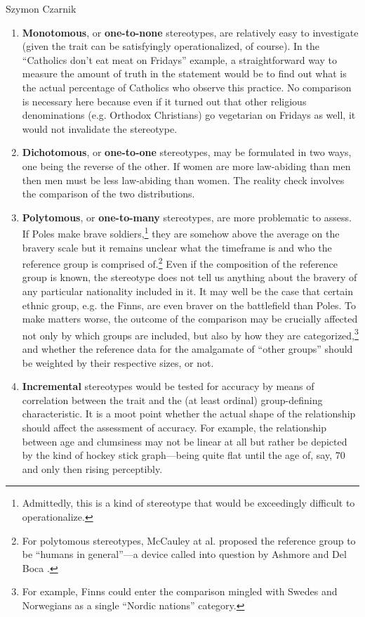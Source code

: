\begin{artengenv}{Szymon Czarnik}
\begin{enumerate}
\item \textbf{Monotomous}, or \textbf{one-to-none} stereotypes, are relatively easy to investigate (given the trait can be satisfyingly operationalized, of course). In the ``Catholics don't eat meat on Fridays'' example, a straightforward way to measure the amount of truth in the statement would be to find out what is the actual percentage of Catholics who observe this practice. No comparison is necessary here because even if it turned out that other religious denominations (e.g. Orthodox Christians) go vegetarian on Fridays as well, it would not invalidate the stereotype.
\item \textbf{Dichotomous}, or \textbf{one-to-one} stereotypes, may be formulated in two ways, one being the reverse of the other. If women are more law-abiding than men then men must be less law-abiding than women. The reality check involves the comparison of the two distributions.
\item \textbf{Polytomous}, or \textbf{one-to-many} stereotypes, are more problematic to assess. If Poles make brave soldiers,\footnote{Admittedly, this is a kind of stereotype that would be exceedingly difficult to operationalize.} they are somehow above the average on the bravery scale but it remains unclear what the timeframe is and who the reference group is comprised of.\footnote{For polytomous stereotypes, McCauley at al.
\parencite*[][]{mccauley_stereotyping_1980} %
 proposed the reference group to be ``humans in general''—a device called into question by Ashmore and Del Boca 
\parencite*[][]{hamilton_conceptual_1981}.%
} Even if the composition of the reference group is known, the stereotype does not tell us anything about the bravery of any particular nationality included in it. It may well be the case that certain ethnic group, e.g. the Finns, are even braver on the battlefield than Poles. To make matters worse, the outcome of the comparison may be crucially affected not only by which groups are included, but also by how they are categorized,\footnote{For example, Finns could enter the comparison mingled with Swedes and Norwegians as a single ``Nordic nations'' category. } and whether the reference data for the amalgamate of ``other groups'' should be weighted by their respective sizes, or not.
\item \textbf{Incremental} stereotypes would be tested for accuracy by means of correlation between the trait and the (at least ordinal) group-defining characteristic. It is a moot point whether the actual shape of the relationship should affect the assessment of accuracy. For example, the relationship between age and clumsiness may not be linear at all but rather be depicted by the kind of hockey stick graph—being quite flat until the age of, say, 70 and only then rising perceptibly.

\end{enumerate}
\end{artengenv}
